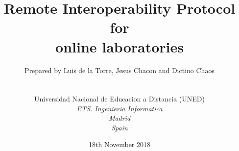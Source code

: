 
\def\Company{Universidad Nacional de Educacion a Distancia (UNED)}
\def\Institute{\textit{ETS. Ingenieria Informatica}}
\def\City{\textit{Madrid}}
\def\Country{\textit{Spain}}

\def\BoldTitle{Remote Interoperability Protocol}

\def\Subtitle{for \\ online laboratories \\}
\def\Authors{Prepared by Luis de la Torre, Jesus Chacon and Dictino Chaos } 
\def\Shortname{L. de la Torre, J. Chacon, D. Chaos}


\title{\textbf{\BoldTitle}\\\Subtitle}
\author{\Authors \\ \\ \\ \Company \\ \Institute\\ \City\\ \Country}
\date{18th November 2018}

